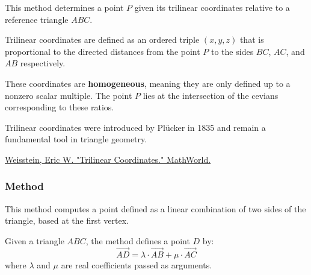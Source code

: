 This method determines a point $P$ given its trilinear coordinates relative to a reference triangle $ABC$.

\medskip
\noindent
Trilinear coordinates are defined as an ordered triple $(x, y, z)$ that is proportional to the directed distances from the point $P$ to the sides $BC$, $AC$, and $AB$ respectively.

\medskip
\noindent
These coordinates are \textbf{homogeneous}, meaning they are only defined up to a nonzero scalar multiple. The point $P$ lies at the intersection of the cevians corresponding to these ratios.

\medskip
\noindent
Trilinear coordinates were introduced by Plücker in 1835 and remain a fundamental tool in triangle geometry.
\begin{flushright}
\small
\href{https://mathworld.wolfram.com/TrilinearCoordinates.html}{Weisstein, Eric W. "Trilinear Coordinates." MathWorld.}
\end{flushright}

\vspace{1em}
\begin{tkzexample}[latex=.5\textwidth]
\begin{center}
\end{center}
\end{tkzexample}


\subsubsection{Method } %
\label{ssub:method_triangle_base}

This method computes a point defined as a linear combination of two sides of the triangle, based at the first vertex.

\medskip
\noindent
Given a triangle $ABC$, the method defines a point $D$ by:
\[
\overrightarrow{AD} = \lambda \cdot \overrightarrow{AB} + \mu \cdot \overrightarrow{AC}
\]
where $\lambda$ and $\mu$ are real coefficients passed as arguments.

